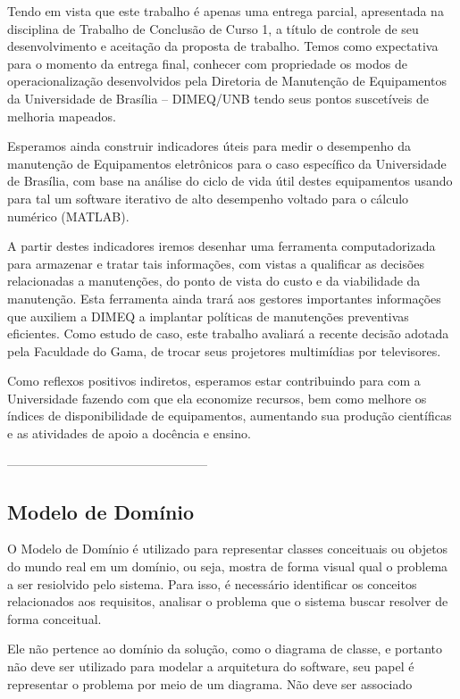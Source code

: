 Tendo em vista que este trabalho é apenas uma entrega parcial, apresentada na disciplina de Trabalho de Conclusão de Curso 1, a título de controle de seu desenvolvimento e aceitação da proposta de trabalho. Temos como expectativa para o momento da entrega final, conhecer com propriedade os modos de operacionalização desenvolvidos pela Diretoria de Manutenção de Equipamentos da Universidade de Brasília – DIMEQ/UNB tendo seus pontos suscetíveis de melhoria mapeados.

Esperamos ainda construir indicadores úteis para medir o desempenho da manutenção de Equipamentos eletrônicos para o caso específico da Universidade de Brasília, com base na análise do ciclo de vida útil destes equipamentos usando para tal um software iterativo de alto desempenho voltado para o cálculo numérico (MATLAB).

A partir destes indicadores iremos desenhar uma ferramenta computadorizada para armazenar e tratar tais informações, com vistas a qualificar as decisões relacionadas a manutenções, do ponto de vista do custo e da viabilidade da manutenção. Esta ferramenta ainda trará aos gestores importantes informações que auxiliem a DIMEQ a implantar políticas de manutenções preventivas eficientes. Como estudo de caso, este trabalho avaliará a recente decisão adotada pela Faculdade do Gama, de trocar seus projetores multimídias por televisores.

Como reflexos positivos indiretos, esperamos estar contribuindo para com a Universidade fazendo com que ela economize recursos, bem como melhore os índices de disponibilidade de equipamentos, aumentando sua produção científicas e as atividades de apoio a docência e ensino.


------------------------------------------------



\subsection{Modelo de Domínio}

O Modelo de Domínio é utilizado para representar classes conceituais ou objetos do mundo real em um domínio, ou seja, mostra de forma visual qual o problema a ser resiolvido pelo sistema. Para isso, é necessário identificar os conceitos relacionados aos requisitos, analisar o problema que o sistema buscar resolver de forma conceitual.

Ele não pertence ao domínio da solução, como o diagrama de classe, e portanto não deve ser utilizado para modelar a arquitetura do software, seu papel é representar o problema por meio de um diagrama. Não deve ser associado

